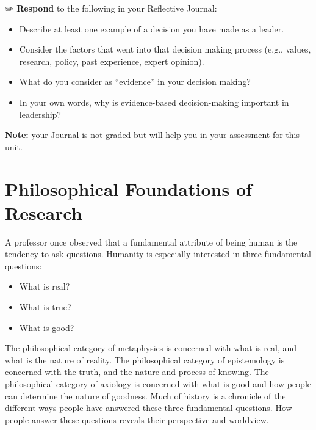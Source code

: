 \documentclass[
  letterpaper,
  DIV=11,
  numbers=noendperiod]{scrreprt}
\providecommand{\tightlist}{%
  \setlength{\itemsep}{0pt}\setlength{\parskip}{0pt}}\usepackage{longtable,booktabs,array}
\begin{document}
✏️ \textbf{Respond} to the following in your Reflective Journal:

\begin{itemize}
\tightlist
\item
  Describe at least one example of a decision you have made as a leader.
\item
  Consider the factors that went into that decision making process
  (e.g., values, research, policy, past experience, expert opinion).
\item
  What do you consider as ``evidence'' in your decision making?
\item
  In your own words, why is evidence-based decision-making important in
  leadership?
\end{itemize}

\textbf{Note:} your Journal is not graded but will help you in your
assessment for this unit.


\chapter*{Philosophical Foundations of
Research}\label{philosophical-foundations-of-research}


A professor once observed that a fundamental attribute of being human is
the tendency to ask questions. Humanity is especially interested in
three fundamental questions:

\begin{itemize}
\tightlist
\item
  What is real?
\item
  What is true?
\item
  What is good?
\end{itemize}

The philosophical category of metaphysics is concerned with what is
real, and what is the nature of reality. The philosophical category of
epistemology is concerned with the truth, and the nature and process of
knowing. The philosophical category of axiology is concerned with what
is good and how people can determine the nature of goodness. Much of
history is a chronicle of the different ways people have answered these
three fundamental questions. How people answer these questions reveals
their perspective and worldview.
\end{document}
